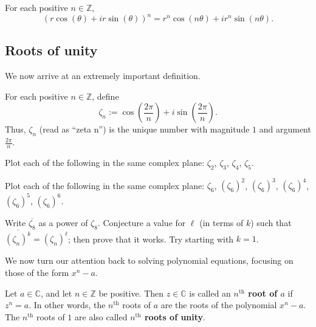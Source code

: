 \begin{corollary}\label{cor.DeMoivre}
For each positive $n\in \mathbb{Z}$, \[\left(r\cos(\theta) + ir\sin(\theta)\right)^n = r^n\cos(n\theta) + ir^n\sin(n\theta).\]
\end{corollary}

\subsection{Roots of unity}
We now arrive at an extremely important definition.

\begin{definition}
For each positive $n\in \mathbb{Z}$, define \[\zeta_n := \cos\left(\frac{2\pi}{n}\right) + i\sin\left(\frac{2\pi}{n}\right).\]
Thus, $\zeta_n$ (read as ``zeta n'') is the unique  number with magnitude $1$ and argument $\frac{2\pi}{n}$.
\end{definition}

\begin{problem}
Plot each of the following in the same complex plane: $\zeta_2$, $\zeta_3$, $\zeta_4$, $\zeta_5$.
\end{problem}

\begin{problem}
Plot each of the following in the same complex plane: $\zeta_6$, $(\zeta_6)^2$, $(\zeta_6)^3$, $(\zeta_6)^4$, $(\zeta_6)^5$, $(\zeta_6)^6$.
\end{problem}

\begin{problem}
Write $\overline{\zeta_8}$ as a power of $\zeta_8$. Conjecture a value for $\ell$ (in terms of $k$) such that $\overline{(\zeta_n)^k}=(\zeta_n)^\ell$; then prove that it works. Try starting with $k= 1$.
\end{problem}

We now turn our attention back to solving polynomial equations, focusing on those of the form $x^n - a$.

\begin{definition}\label{def.nthRoot}
Let $a\in \mathbb{C}$, and let $n\in \mathbb{Z}$ be positive. Then $z\in \mathbb{C}$ is called an \textbf{$n^\text{th}$ root of $a$} if $z^n = a$. In other words, the  $n^\text{th}$ roots of $a$ are the roots of the polynomial $x^n-a$. The  $n^\text{th}$ roots of $1$ are also called \textbf{$n^\text{th}$ roots of unity}.
\end{definition}

